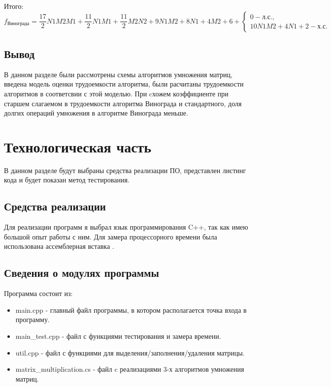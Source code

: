 \documentclass[utf8x, 12pt]{G7-32}
\begin{document}
            Итого:
            \begin{equation}
                f_\text{Винограда} = \frac{17}{2}N1M2M1 + \frac{11}{2}N1M1 + \frac{11}{2}M2N2 + 9N1M2 + 8N1 + 4M2 + 6 + 
                    \left\{ \begin{matrix}
                    0 - \text{л.с.},\\
                    10N1M2 + 4N1 + 2 - \text{х.с.} 
                    \end{matrix}\right.
            \end{equation}

\section{Вывод}
В данном разделе были рассмотрены схемы алгоритмов умножения матриц, введена модель оценки трудоемкости алгоритма, были расчитаны трудоемкости алгоритмов в соответсвии с этой моделью. При cхожем коэффициенте при старшем слагаемом в трудоемкости алгоритма Винограда и стандартного, доля долгих операций умножения в алгоритме Винограда меньше.

\chapter{Технологическая часть}
В данном разделе будут выбраны средства реализации ПО, представлен листинг кода
и будет показан метод тестирования.
\section{Средства реализации}
Для реализации программ я выбрал язык программирования C++, так как имею большой опыт работы с ним.
Для замера процессорного времени была использована ассемблерная вставка \cite{link_time}.


\section{Сведения о модулях программы}
Программа состоит из:
\begin{itemize}
	\item main.cpp - главный файл программы, в котором располагается точка входа в программу.
	\item main\_test.cpp - файл с функциями тестирования и замера времени.
	\item util.cpp - файл с функциями для выделения/заполнения/удаления матрицы.
	\item matrix\_multiplication.cs - файл c реализациями 3-х алгоритмов умножения матриц.
\end{itemize}
\end{document}
